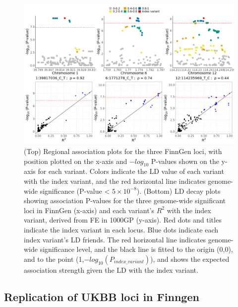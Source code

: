 \begin{figure}[H] 
  \centering    
  \includegraphics[width=1.0\textwidth]{Vector/finngen_regional_assoc_ld_decay_plots.png}
  \caption[Figure]{(Top) Regional association plots for the three FinnGen loci, with position plotted on the x-axis and $-log_{10}$ P-values shown on the y-axis for each variant. Colors indicate the LD value of each variant with the index variant, and the red horizontal line indicates genome-wide significance (P-value < $5\times10^{-8}$). (Bottom) LD decay plots showing association P-values for the three genome-wide significant loci in FinnGen (x-axis) and each variant's $R^{2}$ with the index variant, derived from FE in 1000GP (y-axis). Red dots and titles indicate the index variant in each locus. Blue dots indicate each index variant's LD friends. The red horizontal line indicates genome-wide significance level, and the black line is fitted to the origin (0,0), and to the point (1,$-log_{10}(P_{index\_variant})$), and shows the expected association strength given the LD with the index variant.}
  \label{fig:finngen_regional_assoc_ld_decay_plots}
  \end{figure}




\subsection{Replication of UKBB loci in Finngen}

